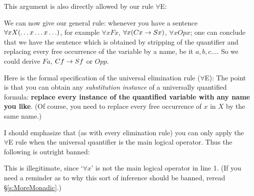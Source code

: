 
This argument is also directly allowed by our rule $\forall$E:
\begin{pf}
	 
\end{pf}

We can now give our general rule: whenever you have a sentence $\forall xX(\ldots x \ldots x\ldots)$, for example $\forall x Fx$, $\forall x (Cx\rightarrow Sx)$, $\forall x Opx$; one can conclude that we have the sentence which is obtained by stripping of the quantifier and replacing every free occurrence of the variable by a name, be it $a,b,c\ldots$. So we could derive $Fa$, $Cf\rightarrow Sf$ or $Opp$.


Here is the formal specification of the universal elimination rule ($\forall$E):
The point is that you can obtain any \emph{substitution instance} of a universally quantified formula: \textbf{replace every instance of the quantified variable with any name you like}. (Of course, you need to replace every free occurrence of $x$ in $X$ by the same name.)

I should emphasize that (as with every elimination rule) you can only apply the $\forall$E rule when the universal quantifier is the main logical operator. Thus the following is outright banned:
\begin{pf}
\end{pf}
This is illegitimate, since `$\forall x$' is not the main logical operator in line 1. (If you need a reminder as to why this sort of inference should be banned, reread \S\ref{s:MoreMonadic}.)

